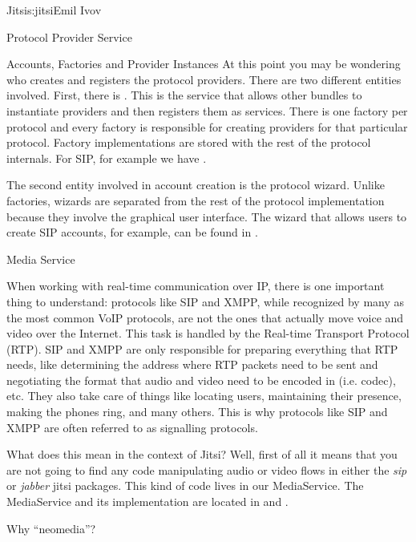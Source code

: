 \begin{aosachapter}{Jitsi}{s:jitsi}{Emil Ivov}
\begin{aosasect1}{Protocol Provider Service}
\begin{aosasect2}{Accounts, Factories and Provider Instances}
At this point you may be wondering who creates and registers the
protocol providers.  There are two different entities involved. First,
there is . This is the service that
allows other bundles to instantiate providers and then registers them
as services. There is one factory per protocol and every factory is
responsible for creating providers for that particular
protocol. Factory implementations are stored with the rest of the
protocol internals. For SIP, for example we have
.

The second entity involved in account creation is the protocol wizard.
Unlike factories, wizards are separated from the rest of the protocol
implementation because they involve the graphical user interface. The
wizard that allows users to create SIP accounts, for example, can be
found in .

\end{aosasect2}

\end{aosasect1}

\begin{aosasect1}{Media Service}

When working with real-time communication over IP, there is one
important thing to understand: protocols like SIP and XMPP, while
recognized by many as the most common VoIP protocols, are not the ones
that actually move voice and video over the Internet. This task is
handled by the Real-time Transport Protocol (RTP).  SIP and XMPP are
only responsible for preparing everything that RTP needs, like
determining the address where RTP packets need to be sent and
negotiating the format that audio and video need to be encoded in
(i.e. codec), etc. They also take care of things like locating users,
maintaining their presence, making the phones ring, and many
others. This is why protocols like SIP and XMPP are often referred to
as signalling protocols.

What does this mean in the context of Jitsi? Well, first of all it
means that you are not going to find any code manipulating audio or
video flows in either the \emph{sip} or \emph{jabber} jitsi packages.
This kind of code lives in our MediaService. The MediaService and its
implementation are located in
 and
.

\begin{aosabox}{Why ``neomedia''?}


\end{aosabox}
\end{aosasect1}
\end{aosachapter}
